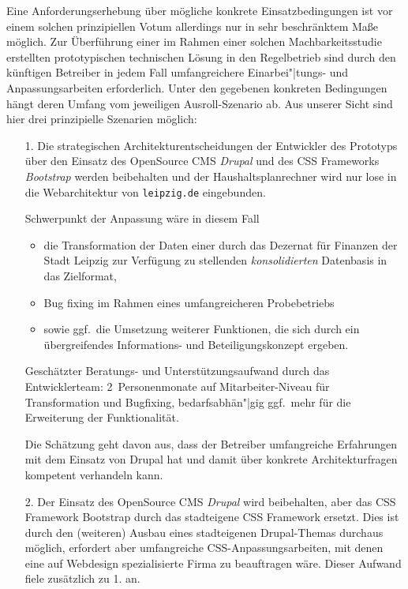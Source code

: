 \documentclass[11pt,a4paper,twoside]{article}
\begin{document}
Eine Anforderungserhebung über mögliche konkrete Einsatzbedingungen ist vor
einem solchen prinzipiellen Votum allerdings nur in sehr beschränktem Maße
möglich.  Zur Überführung einer im Rahmen einer solchen Machbarkeitsstudie
erstellten prototypischen technischen Lösung in den Regelbetrieb sind durch
den künftigen Betreiber in jedem Fall umfangreichere Einarbei"|tungs- und
Anpassungsarbeiten erforderlich. Unter den gegebenen konkreten Bedingungen
hängt deren Umfang vom jeweiligen Ausroll-Szenario ab. Aus unserer Sicht sind
hier drei prinzipielle Szenarien möglich:
\begin{itemize}
\item[1.] Die strategischen Architekturentscheidungen der Entwickler des
  Prototyps über den Einsatz des OpenSource CMS \emph{Drupal} und des CSS
  Frameworks \emph{Bootstrap} werden beibehalten und der Haushaltsplanrechner
  wird nur lose in die Webarchitektur von \texttt{leipzig.de} eingebunden.

  Schwerpunkt der Anpassung wäre in diesem Fall
  \begin{itemize}
  \item die Transformation der Daten einer durch das Dezernat für Finanzen der
    Stadt Leipzig zur Verfügung zu stellenden \emph{konsolidierten} Datenbasis
    in das Zielformat,
  \item Bug fixing im Rahmen eines umfangreicheren Probebetriebs
  \item sowie ggf.\ die Umsetzung weiterer Funktionen, die sich durch ein
    übergreifendes Informations- und Beteiligungskonzept ergeben.
  \end{itemize}
  Geschätzter Beratungs- und Unterstützungsaufwand durch das Entwicklerteam:
  2~Personenmonate auf Mitarbeiter-Niveau für Transformation und Bugfixing,
  bedarfsabhän"|gig ggf.\ mehr für die Erweiterung der Funktionalität.

  Die Schätzung geht davon aus, dass der Betreiber umfangreiche Erfahrungen mit
  dem Einsatz von Drupal hat und damit über konkrete Architekturfragen
  kompetent verhandeln kann. 
\item [2.] Der Einsatz des OpenSource CMS \emph{Drupal} wird beibehalten, aber
  das CSS Framework Bootstrap durch das stadteigene CSS Framework ersetzt. Dies
  ist durch den (weiteren) Ausbau eines stadteigenen Drupal-Themas durchaus
  möglich, erfordert aber umfangreiche CSS-Anpassungsarbeiten, mit denen eine
  auf Webdesign spezialisierte Firma zu beauftragen wäre.  Dieser Aufwand fiele
  zusätzlich zu 1. an.


\end{itemize}
\end{document}
